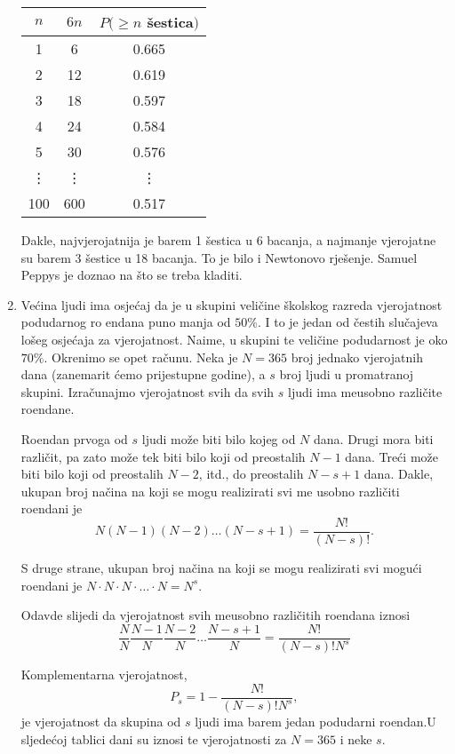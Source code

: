 \documentclass{ppclanak}
\begin{document}
\begin{enumerate}
\begin{center}
\begin{tabular}{c|c|c}
$n$ & $6n$ & $P(\geq n$ \v{s}estica$)$\\
\hline 1 & 6 & 0.665\\
2 & 12 & 0.619 \\
3 & 18 & 0.597 \\
4 & 24 & 0.584 \\
5 & 30 & 0.576 \\
\vdots & \vdots & \vdots \\
100 & 600 & 0.517
\end{tabular}
\end{center}

Dakle, najvjerojatnija je barem 1 \v{s}estica u 6 bacanja, a
najmanje vjerojatne su barem 3 \v{s}estice u 18 bacanja. To je
bilo i Newtonovo rje\v{s}enje. Samuel Peppys je doznao na \v{s}to
se treba kladiti.

\item Ve\'{c}ina ljudi ima osje\'{c}aj da je u skupini
veli\v{c}ine \v{s}kolskog razreda vjerojatnost podudarnog ro\dj
endana puno manja od $50\%$. I to je jedan od \v{c}estih
slu\v{c}ajeva lo\v{s}eg osje\'{c}aja za vjerojatnost. Naime, u
skupini te veli\v{c}ine podudarnost je oko $70\%$. Okrenimo se
opet ra\v{c}unu. Neka je $N=365$ broj jednako vjerojatnih dana
(zanemarit \'{c}emo prijestupne godine), a $s$ broj ljudi u
promatranoj skupini. Izra\v{c}unajmo vjerojatnost svih da svih $s$
ljudi ima me\dj usobno razli\v{c}ite ro\dj endane.

Ro\dj endan prvoga od $s$ ljudi mo\v{z}e biti bilo kojeg od $N$
dana. Drugi mora biti razli\v{c}it, pa zato mo\v{z}e tek biti bilo
koji od preostalih $N-1$ dana. Tre\'{c}i mo\v{z}e biti bilo koji
od preostalih $N-2$, itd., do preostalih $N-s+1$ dana. Dakle,
ukupan broj na\v{c}ina na koji se mogu realizirati svi me\dj
usobno razli\v{c}iti ro\dj endani je
\[N(N-1)(N-2)\ldots (N-s+1)=\frac{N!}{(N-s)!}.\]

S druge strane, ukupan broj na\v{c}ina na koji se mogu realizirati
svi mogu\'{c}i ro\dj endani je  $N\cdot N\cdot N\cdot \ldots \cdot
N=N^s$.

Odavde slijedi da vjerojatnost svih me\dj usobno razli\v{c}itih
ro\dj endana iznosi
\[\frac{N}{N}\frac{N-1}{N}\frac{N-2}{N}\ldots \frac{N-s+1}{N}=\frac{N!}{(N-s)! N^s} \]

Komplementarna vjerojatnost,
\[P_s=1-\frac{N!}{(N-s)!N^s} ,\]
je vjerojatnost da skupina od $s$ ljudi ima barem jedan podudarni
ro\dj endan.U sljede\'{c}oj tablici dani su iznosi te
vjerojatnosti za $N=365$ i neke $s$.


\end{enumerate}
\end{document}
